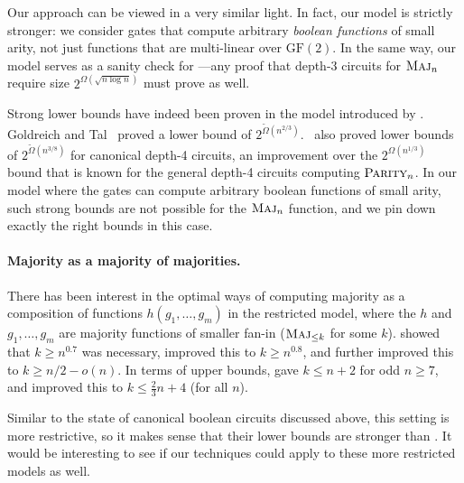 \documentclass[10pt,a4paper]{article}
\theoremstyle{definition}
\theoremstyle{remark}
\newcommand{\mathsc}[1]{{\normalfont\textsc{#1}}}
\DeclareMathOperator{\Maj}{\mathsc{Maj}}
\newcommand{\Parity}{\mathsc{Parity}}
\begin{document}
Our approach can be viewed in a very similar light.
In fact, our model is strictly stronger:
we consider gates that compute arbitrary \emph{boolean functions} of small arity, not just functions that are multi-linear over $\mathrm{GF}(2)$.
In the same way, our model serves as a sanity check for ---any proof that depth-3 circuits for $\Maj_n$ require size $2^{\Omega(\sqrt{n\log n})}$ must prove  as well.

Strong lower bounds have indeed been proven in the model introduced by \cite{GW20}.  Goldreich and Tal~\cite{GT18} proved a lower bound of $2^{\tilde{\Omega}(n^{2/3})}$.~\cite{GT20} also proved lower bounds of $2^{\tilde{\Omega}(n^{3/8})}$ for canonical depth-4 circuits, an improvement over the $2^{\Omega(n^{1/3})}$ bound that is known for the general depth-4 circuits computing $\Parity_n$.  In our model where the gates can compute arbitrary boolean functions of small arity, such strong bounds are not possible for the $\Maj_n$ function, and we pin down exactly the right bounds in this case. 





\paragraph*{Majority as a majority of majorities.} There has been interest \cite{KP19,EGMR20,HNRRY19,KM18,Pos17} in the optimal ways of computing majority as a composition of functions $h(g_1, \ldots, g_m)$ in the restricted model, where the $h$ and $g_1, \ldots, g_m$ are majority functions of smaller fan-in ($\Maj_{\leq k}$ for some $k$). \cite{KP19} showed that $k\geq n^{0.7}$ was necessary, \cite{EGMR20} improved this to $k \geq n^{0.8}$, and \cite{HNRRY19} further improved this to $k \geq n/2 - o(n)$. In terms of upper bounds, \cite{KM18} gave $k \leq n+2$ for odd $n \geq 7$, and \cite{Pos17} improved this to $k \leq \frac{2}{3}n+4$ (for all $n$).


Similar to the state of canonical boolean circuits discussed above, this setting is more restrictive, so it makes sense that their lower bounds are stronger than . 
It would be interesting to see if our techniques could apply to these more restricted models as well.
\end{document}
